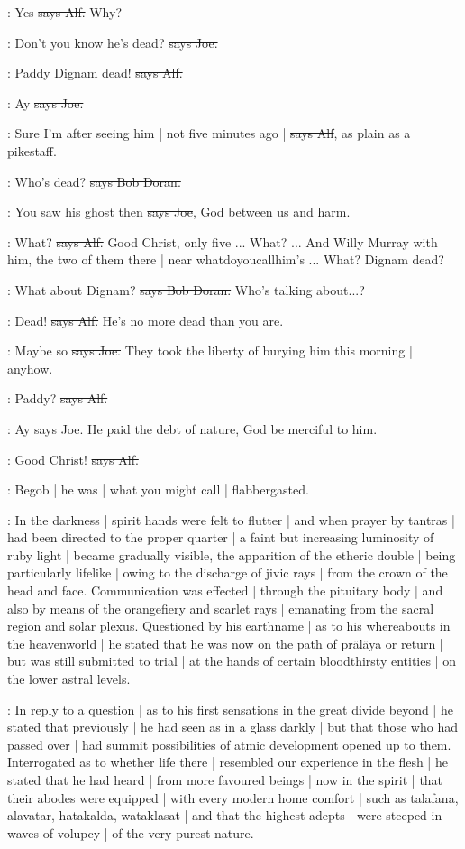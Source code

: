 \bergan:
Yes
\sout{says Alf.}
Why?

\joe:
Don't you know he's dead?
\sout{says Joe.}

\bergan:
Paddy Dignam dead!
\sout{says Alf.}

\joe:
Ay
\sout{says Joe.}

\bergan:
Sure I'm after seeing him |
not five minutes ago |
\sout{says Alf},
as plain as a pikestaff.

\doran:
Who's dead?
\sout{says Bob Doran.}

\joe:
You saw his ghost then
\sout{says Joe},
God between us and harm.

\bergan:
What?
\sout{says Alf.}
Good Christ,
only five ...
What?
...
And Willy Murray with him,
the two of them there |
near whatdoyoucallhim's ...
What?
Dignam dead?

\doran:
What about Dignam?
\sout{says Bob Doran.}
Who's talking about...?

\bergan:
Dead!
\sout{says Alf.}
He's no more dead than you are.

\joe:
Maybe so
\sout{says Joe.}
They took the liberty of burying him this morning |
anyhow.

\bergan:
Paddy?
\sout{says Alf.}

\joe:
Ay
\sout{says Joe.}
He paid the debt of nature,
God be merciful to him.

\bergan:
Good Christ!
\sout{says Alf.}

\Nq:
Begob |
he was |
what you might call |
flabbergasted.

:
In the darkness |
spirit hands were felt to flutter |
and when prayer by tantras |
had been directed to the proper quarter |
a faint but increasing luminosity of ruby light |
became gradually visible,
the apparition of the etheric double |
being particularly lifelike |
owing to the discharge of jivic rays |
from the crown of the head and face.
Communication was effected |
through the pituitary body |
and also by means of the orangefiery and scarlet rays |
emanating from the sacral region and solar plexus.
Questioned by his earthname |
as to his whereabouts in the heavenworld |
he stated that he was now on the path of präläya or return |
but was still submitted to trial |
at the hands of certain bloodthirsty entities |
on the lower astral levels.

:
In reply to a question |
as to his first sensations in the great divide beyond |
he stated that previously |
he had seen as in a glass darkly |
but that those who had passed over |
had summit possibilities of atmic development opened up to them.
Interrogated as to whether life there |
resembled our experience in the flesh |
he stated that he had heard |
from more favoured beings |
now in the spirit |
that their abodes were equipped |
with every modern home comfort |
such as talafana,
alavatar,
hatakalda,
wataklasat |
and that the highest adepts |
were steeped in waves of volupcy |
of the very purest nature.


